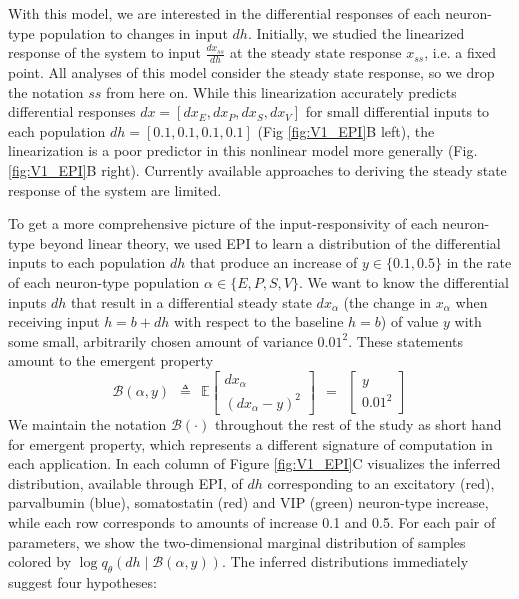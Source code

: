 \documentclass[11pt]{article}
\begin{document}
With this model, we are interested in the differential responses of each neuron-type population to changes in input $dh$. 
Initially, we studied the linearized response of the system to input $\frac{dx_{ss}}{dh}$ at the steady state response $x_{ss}$, i.e. a fixed point. 
All analyses of this model consider the steady state response, so we drop the notation $ss$ from here on.
While this linearization accurately predicts differential responses $dx = \left[ dx_{E} , dx_{P} , dx_{S} ,dx_{V} \right]$  for small differential inputs to each population $dh = \left[ 0.1 , 0.1 , 0.1 , 0.1 \right]$ (Fig \ref{fig:V1_EPI}B left), the linearization is a poor predictor in this nonlinear model more generally (Fig. \ref{fig:V1_EPI}B right).  Currently available approaches to deriving the steady state response of the system are limited.

To get a more comprehensive picture of the input-responsivity of each neuron-type beyond linear theory, we used EPI to learn a distribution of the differential inputs to each population $dh$ that produce an increase of $y \in \{0.1, 0.5\}$ in the rate of each neuron-type population $\alpha \in \{E, P, S, V \}$.  
We want to know the differential inputs $dh$ that result in a differential steady state $dx_{\alpha}$ (the change in $x_{\alpha}$ when receiving input $h=b + dh$ with respect to the baseline $h = b$) of value $y$ with some small, arbitrarily chosen amount of variance  $0.01^2$.   
These statements amount to the emergent property 
\begin{equation}
\mathcal{B}(\alpha, y) ~~\triangleq~~ 
\mathbb{E} \begin{bmatrix} dx_{\alpha} \\ (dx_{\alpha} - y)^2 \end{bmatrix} ~~=~~ \begin{bmatrix} y \\ 0.01^2 \end{bmatrix}
\end{equation}
We maintain the notation $\mathcal{B}(\cdot)$ throughout the rest of the study as short hand for emergent property, which represents a different signature of computation in each application. In each column of Figure \ref{fig:V1_EPI}C visualizes the inferred distribution, available through EPI, of $dh$ corresponding to an excitatory (red), parvalbumin (blue), somatostatin (red) and VIP (green) neuron-type increase, while each row corresponds to amounts of increase 0.1 and 0.5.  For each pair of parameters, we show the two-dimensional marginal distribution of samples colored by $\log q_\theta(dh \mid \mathcal{B}(\alpha, y))$.  The inferred distributions immediately suggest four hypotheses: \\
\end{document}
